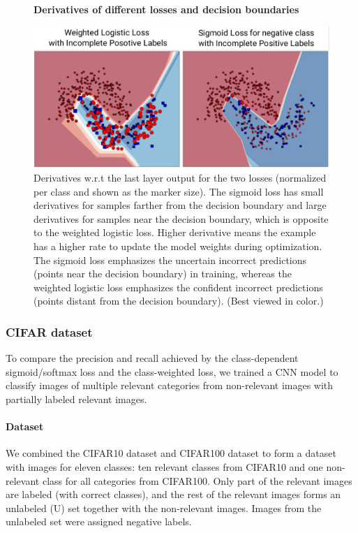 \begin{figure}[t]
\begin{center}
\textbf{Derivatives of different losses and decision boundaries}\par\medskip
   \includegraphics[width=\linewidth]{img/moons_diff}
\end{center}
   \caption{
   Derivatives w.r.t the last layer output for the two losses (normalized per class and shown as the marker size).
   The sigmoid loss has small derivatives for samples farther from the decision boundary and large derivatives for samples near the decision boundary, which is opposite to the weighted logistic loss.
   Higher derivative means the example has a higher rate to update the model weights during optimization.
   The sigmoid loss emphasizes the uncertain incorrect predictions (points near the decision boundary) in training, whereas the weighted logistic loss emphasizes the confident incorrect predictions (points distant from the decision boundary).
   (Best viewed in color.)
   }
\label{fig:moonsdiff}
\end{figure}



\subsubsection{CIFAR dataset}

To compare the precision and recall achieved by the class-dependent sigmoid/softmax loss and the class-weighted loss, we trained a CNN model to classify images of multiple relevant categories from non-relevant images with partially labeled relevant images.

\paragraph{Dataset}
We combined the CIFAR10 dataset and CIFAR100 dataset \cite{krizhevsky2009learning} to form a dataset with images for eleven classes: ten relevant classes from CIFAR10 and one non-relevant class for all categories from CIFAR100.
Only part of the relevant images are labeled (with correct classes), and the rest of the relevant images forms an unlabeled (U) set together with the non-relevant images.
Images from the unlabeled set were assigned negative labels.

